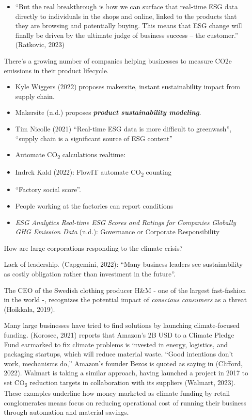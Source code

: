 \documentclass[
  letterpaper,
  DIV=11,
  numbers=noendperiod]{scrartcl}
\providecommand{\tightlist}{%
  \setlength{\itemsep}{0pt}\setlength{\parskip}{0pt}}\usepackage{longtable,booktabs,array}
\begin{document}
\begin{itemize}
\tightlist
\item
  ``But the real breakthrough is how we can surface that real-time ESG
  data directly to individuals in the shops and online, linked to the
  products that they are browsing and potentially buying. This means
  that ESG change will finally be driven by the ultimate judge of
  business success -- the customer.'' (Ratkovic, 2023)
\end{itemize}

There's a growing number of companies helping businesses to measure CO2e
emissions in their product lifecycle.

\begin{itemize}
\item
  Kyle Wiggers (2022) proposes makersite, instant sustainability impact
  from supply chain.
\item
  Makersite (n.d.) proposes \textbf{\emph{product sustainability
  modeling}}.
\item
  Tim Nicolle (2021) ``Real-time ESG data is more difficult to
  greenwash'', ``supply chain is a significant source of ESG content''
\item
  Automate CO\textsubscript{2} calculations realtime:
\item
  Indrek Kald (2022): FlowIT automate CO\textsubscript{2} counting
\item
  ``Factory social score''.
\item
  People working at the factories can report conditions
\item
  \emph{{ESG Analytics} {\textbar} {Real-time ESG Scores} and {Ratings}
  for {Companies Globally} {\textbar} {GHG Emission} Data} (n.d.):
  Governance or Corporate Responsibility
\end{itemize}

How are large corporations responding to the climate crisis?

Lack of leadership. (Capgemini, 2022): ``Many business leaders see
sustainability as costly obligation rather than investment in the
future''.

The CEO of the Swedish clothing producer H\&M - one of the largest
fast-fashion in the world -, recognizes the potential impact of
\emph{conscious consumers} as a threat (Hoikkala, 2019).

Many large businesses have tried to find solutions by launching
climate-focused funding. (Korosec, 2021) reports that Amazon's 2B USD to
a Climate Pledge Fund earmarked to fix climate problems is invested in
energy, logistics, and packaging startups, which will reduce material
waste. ``Good intentions don't work, mechanisms do,'' Amazon's founder
Bezos is quoted as saying in (Clifford, 2022). Walmart is taking a
similar approach, having launched a project in 2017 to set
CO\textsubscript{2} reduction targets in collaboration with its
suppliers (Walmart, 2023). These examples underline how money marketed
as climate funding by retail conglomerates means focus on reducing
operational cost of running their business through automation and
material savings.
\end{document}
